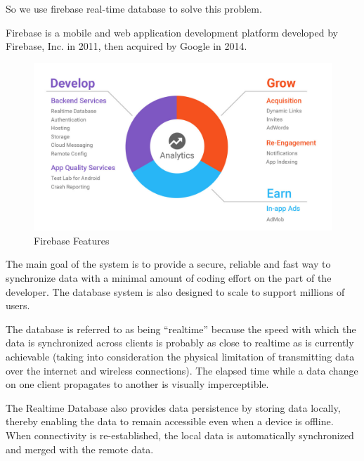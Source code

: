 So we use firebase real-time database to solve this problem.

Firebase is a mobile and web application development platform developed by Firebase, Inc. in 2011, then acquired by Google in 2014.\cite{AF5}

\newline
\begin{figure}[htp]%
    \center%
    \includegraphics[width=1\textwidth]{images/ch4/firebase.png}%
    \caption[Firebase Features]{Firebase Features}\label{fig: Firebase Features}%
  \end{figure}
\newline




The main goal of the system is to provide a secure, reliable and fast way to synchronize data with a minimal amount of coding effort on the part of the developer. The database system is also designed to scale to support millions of users.

The database is referred to as being “realtime” because the speed with which the data is synchronized across clients is probably as close to realtime as is currently achievable (taking into consideration the physical limitation of transmitting data over the internet and wireless connections). The elapsed time while a data change on one client propagates to another is visually imperceptible.

The Realtime Database also provides data persistence by storing data locally, thereby enabling the data to remain accessible even when a device is offline. When connectivity is re-established, the local data is automatically synchronized and merged with the remote data.\cite{AF4}

